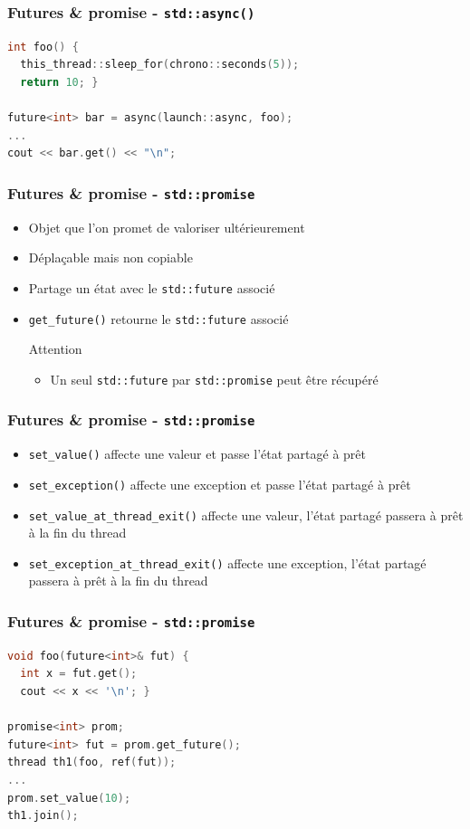\documentclass[C++.tex]{subfiles}
\begin{document}
\begin{frame}[fragile]
	\frametitle{Futures \& promise - \lstinline|std::async()|}
	\begin{lstlisting}[language=C++]
int foo() {
  this_thread::sleep_for(chrono::seconds(5));
  return 10; }

future<int> bar = async(launch::async, foo);
...
cout << bar.get() << "\n";\end{lstlisting}
\end{frame}

\begin{frame}[fragile]
	\frametitle{Futures \& promise - \lstinline|std::promise|}
	\begin{itemize}
		\item Objet que l'on promet de valoriser ultérieurement
		\item Déplaçable mais non copiable
		\item Partage un état avec le \lstinline|std::future| associé
		\item \lstinline|get_future()| retourne le \lstinline|std::future| associé

		\begin{alertblock}{Attention}
			\begin{itemize}
				\item Un seul \lstinline|std::future| par \lstinline|std::promise| peut être récupéré
			\end{itemize}
		\end{alertblock}
	\end{itemize}
\end{frame}

\begin{frame}[fragile]
	\frametitle{Futures \& promise - \lstinline|std::promise|}
	\begin{itemize}
		\item \lstinline|set_value()| affecte une valeur et passe l'état partagé à prêt
		\item \lstinline|set_exception()| affecte une exception et passe l'état partagé à prêt
		\item \lstinline|set_value_at_thread_exit()| affecte une valeur, l'état partagé passera à prêt à la fin du thread
		\item \lstinline|set_exception_at_thread_exit()| affecte une exception, l'état partagé passera à prêt à la fin du thread
	\end{itemize}
\end{frame}

\begin{frame}[fragile]
	\frametitle{Futures \& promise - \lstinline|std::promise|}
	\begin{lstlisting}[language=C++]
void foo(future<int>& fut) {
  int x = fut.get();
  cout << x << '\n'; }

promise<int> prom;
future<int> fut = prom.get_future();
thread th1(foo, ref(fut));
...
prom.set_value(10);
th1.join();\end{lstlisting}
\end{frame}
\end{document}
